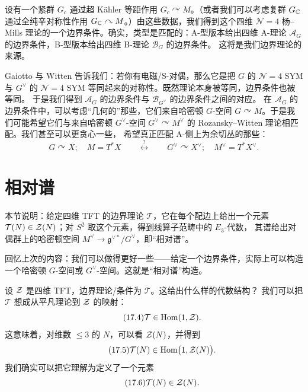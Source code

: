 设有一个紧群 $G_c$ 通过超 Kähler 等距作用 $G_c\curvearrowright M$。（或者我们可以考虑复群
$G_{\mathbb{C}}$ 通过全纯辛对称性作用 $G_{\mathbb{C}}\curvearrowright M$。）由这些数据，我们得到这个四维
$\mathcal N=4$ 杨--Mills 理论的一个边界条件。确实，类型是匹配的：A-型版本给出四维 A-理论
$\mathcal A_G$ 的边界条件，B-型版本给出四维 B-理论 $\mathcal B_G$ 的边界条件。
这将是我们边界理论的来源。

Gaiotto 与 Witten 告诉我们：若你有电磁/S-对偶，那么它是把 $G$ 的 $\mathcal N=4$ SYM 与
$G^{\vee}$ 的 $\mathcal N=4$ SYM 等同起来的对称性。既然理论本身被等同，边界条件也被等同。
于是我们得到 $\mathcal A_G$ 的边界条件与 $\mathcal B_{G^{\vee}}$ 的边界条件之间的对应。
在 $\mathcal A_G$ 的边界条件中，可以考虑“几何的”那些，它们来自哈密顿 $G$-空间
$G\curvearrowright M$。于是我们可能希望它们与来自哈密顿 $G^{\vee}$-空间
$G^{\vee}\curvearrowright M^{\vee}$ 的 Rozansky--Witten 理论相匹配。我们甚至可以更贪心一些，
希望真正匹配 A-侧上为余切丛的那些：
\begin{equation}\tag{17.3}\label{eq:17.3}
G\curvearrowright X;\quad M=T^*X
\qquad\overset{?}{\longleftrightarrow}\qquad
G^{\vee}\curvearrowright X^{\vee};\quad M^{\vee}=T^*X^{\vee}.
\end{equation}

\section{相对谱}

\begin{sectionkey}
本节说明：给定四维 TFT 的边界理论 $\mathcal T$，它在每个配边上给出一个元素
$\mathcal T(N)\in\mathcal{Z}(N)$；对 $S^2$ 取这个元素，得到线算子范畴中的 $E_3$-代数，
其谱给出对偶群上的哈密顿空间 $M^{\vee}\to\mathfrak g^{\vee*}/G^{\vee}$，即“相对谱”。
\end{sectionkey}

回忆上次的内容：我们可以做得更好一些——给定一个边界条件，实际上可以构造一个哈密顿
$G$-空间或 $G^{\vee}$-空间。这就是“相对谱”构造。

设 $\mathcal{Z}$ 是四维 TFT，边界理论/条件为 $\mathcal T$。这给出什么样的代数结构？
我们可以把 $\mathcal T$ 想成从平凡理论到 $\mathcal{Z}$ 的映射：
\begin{equation}\tag{17.4}\label{eq:17.4}
\mathcal T\in\mathrm{Hom}(1,\mathcal{Z}).
\end{equation}
这意味着，对维数 $\le 3$ 的 $N$，可以看 $\mathcal{Z}(N)$，并得到
\begin{equation}\tag{17.5}\label{eq:17.5}
\mathcal T(N)\in\mathrm{Hom}\bigl(1,\mathcal{Z}(N)\bigr).
\end{equation}
我们确实可以把它理解为定义了一个元素
\begin{equation}\tag{17.6}\label{eq:17.6}
\mathcal T(N)\in\mathcal{Z}(N).
\end{equation}

